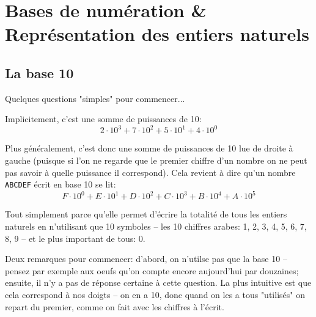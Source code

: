 \documentclass[12pt]{article}
\begin{document}
	 \pagebreak
	 
	 \section{Bases de numération \& Représentation des entiers naturels}
	 
	 
	 \subsection{La base 10}
	 
	 Quelques questions "simples" pour commencer...
\begin{MaReponse}
	Implicitement, c'est une somme de puissances de 10: \[ 2 \cdot 10^3 + 7 \cdot 10^2 + 5 \cdot 10^1 + 4 \cdot 10^0 \]
\end{MaReponse}
	 
\begin{MaReponse}
	Plus généralement, c'est donc une somme de puissances de 10 lue de droite à gauche (puisque si l'on ne regarde que le premier chiffre d'un nombre on ne peut pas savoir à quelle puissance il correspond). Cela revient à dire qu'un nombre \texttt{ABCDEF} écrit en base 10 se lit: \[ F \cdot 10^0 + E \cdot 10^1 + D \cdot 10^2 + C \cdot 10^3 + B \cdot 10^4 + A \cdot 10^5\]
\end{MaReponse}

\begin{MaReponse}
	Tout simplement parce qu'elle permet d'écrire la totalité de tous les entiers naturels en n'utilisant que 10 symboles -- les 10 chiffres arabes: 1, 2, 3, 4, 5, 6, 7, 8, 9 -- et le plus important de tous: 0.
\end{MaReponse}

\begin{MaReponse}
	Deux remarques pour commencer: d'abord, on n'utilse pas que la base 10 -- pensez par exemple aux oeufs qu'on compte encore aujourd'hui par douzaines; ensuite, il n'y a pas de réponse certaine à cette question. La plus intuitive est que cela correspond à nos doigts -- on en a 10, donc quand on les a tous "utilisés" on repart du premier, comme on fait avec les chiffres à l'écrit.
\end{MaReponse}
\end{document}
